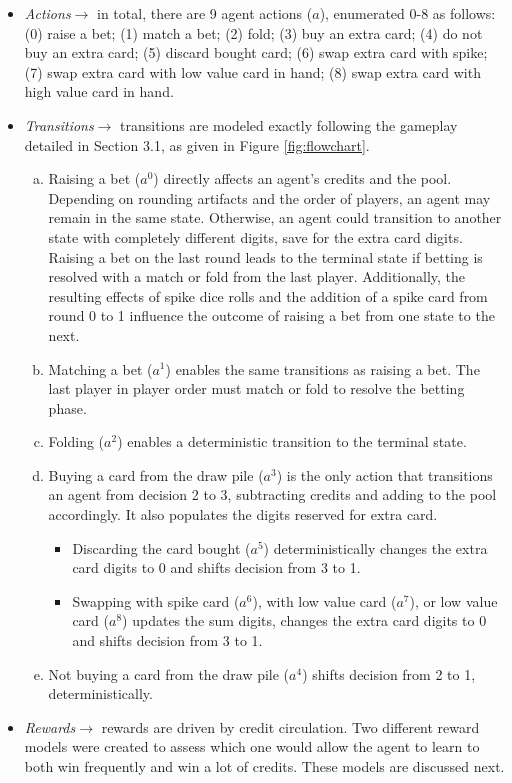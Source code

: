 \documentclass{article}
\begin{document}
\begin{itemize}
    \item \textit{Actions}$\rightarrow$ in total, there are 9 agent actions ($a$), enumerated 0-8 as follows: (0) raise a bet; (1) match a bet; (2) fold; (3) buy an extra card; (4) do not buy an extra card; (5) discard bought card; (6) swap extra card with spike; (7) swap extra card with low value card in hand; (8) swap extra card with high value card in hand.
    \item \textit{Transitions}$\rightarrow$ transitions are modeled exactly following the gameplay detailed in Section 3.1, as given in Figure \ref{fig:flowchart}.
    \begin{enumerate}[a)]
        \item Raising a bet ($a^0$) directly affects an agent's credits and the pool. Depending on rounding artifacts and the order of players, an agent may remain in the same state. Otherwise, an agent could transition to another state with completely different digits, save for the extra card digits. Raising a bet on the last round leads to the terminal state if betting is resolved with a match or fold from the last player. Additionally, the resulting effects of spike dice rolls and the addition of a spike card from round 0 to 1 influence the outcome of raising a bet from one state to the next.
        \item Matching a bet ($a^1$) enables the same transitions as raising a bet. The last player in player order must match or fold to resolve the betting phase.
        \item Folding ($a^2$) enables a deterministic transition to the terminal state.
        \item Buying a card from the draw pile ($a^3$) is the only action that transitions an agent from decision 2 to 3, subtracting credits and adding to the pool accordingly. It also populates the digits reserved for extra card.
        \begin{itemize}
            \item Discarding the card bought ($a^5$) deterministically changes the extra card digits to 0 and shifts decision from 3 to 1.
            \item Swapping with spike card ($a^6$), with low value card ($a^7$), or low value card ($a^8$) updates the sum digits, changes the extra card digits to 0 and shifts decision from 3 to 1.
        \end{itemize}
        \item Not buying a card from the draw pile ($a^4$) shifts decision from 2 to 1, deterministically.
    \end{enumerate}
    \item \textit{Rewards}$\rightarrow$ rewards are driven by credit circulation. Two different reward models were created to assess which one would allow the agent to learn to both win frequently and win a lot of credits. These models are discussed next.
\end{itemize}
\end{document}
